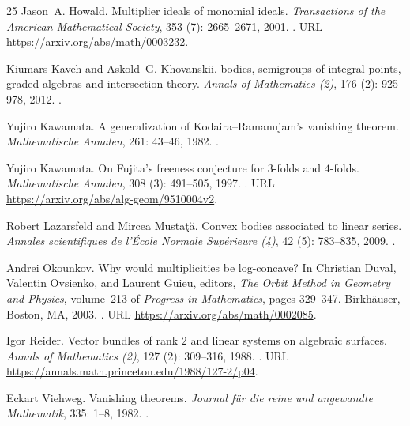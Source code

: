 \begin{thebibliography}{25}
Jason~A. Howald.
\newblock Multiplier ideals of monomial ideals.
\newblock \emph{Transactions of the American Mathematical Society}, 353 (7): 2665--2671, 2001.
\newblock {}.
\newblock URL \url{https://arxiv.org/abs/math/0003232}.

Kiumars Kaveh and Askold~G. Khovanskii.
 bodies, semigroups of integral points, graded algebras and intersection theory.
\newblock \emph{Annals of Mathematics (2)}, 176 (2): 925--978, 2012.
\newblock {}.

Yujiro Kawamata.
\newblock A generalization of {Kodaira--Ramanujam}'s vanishing theorem.
\newblock \emph{Mathematische Annalen}, 261: 43--46, 1982.
\newblock {}.

Yujiro Kawamata.
\newblock On {Fujita}'s freeness conjecture for $3$-folds and $4$-folds.
\newblock \emph{Mathematische Annalen}, 308 (3): 491--505, 1997.
\newblock {}.
\newblock URL \url{https://arxiv.org/abs/alg-geom/9510004v2}.

Robert Lazarsfeld and Mircea Musta{\c t}{\u a}.
\newblock Convex bodies associated to linear series.
\newblock \emph{Annales scientifiques de l'{\'E}cole Normale Sup{\'e}rieure (4)}, 42 (5): 783--835, 2009.
\newblock {}.

Andrei Okounkov.
\newblock Why would multiplicities be log-concave?
\newblock In Christian Duval, Valentin Ovsienko, and Laurent Guieu, editors,
  \emph{The Orbit Method in Geometry and Physics}, volume~213 of
  \emph{Progress in Mathematics}, pages 329--347. Birkh{\"a}user, Boston, MA, 2003.
\newblock {}.
\newblock URL \url{https://arxiv.org/abs/math/0002085}.

Igor Reider.
\newblock Vector bundles of rank $2$ and linear systems on algebraic surfaces.
\newblock \emph{Annals of Mathematics (2)}, 127 (2): 309--316, 1988.
\newblock {}.
\newblock URL \url{https://annals.math.princeton.edu/1988/127-2/p04}.

Eckart Viehweg.
\newblock Vanishing theorems.
\newblock \emph{Journal f{\"u}r die reine und angewandte Mathematik}, 335: 1--8, 1982.
\newblock {}.


\end{thebibliography}
